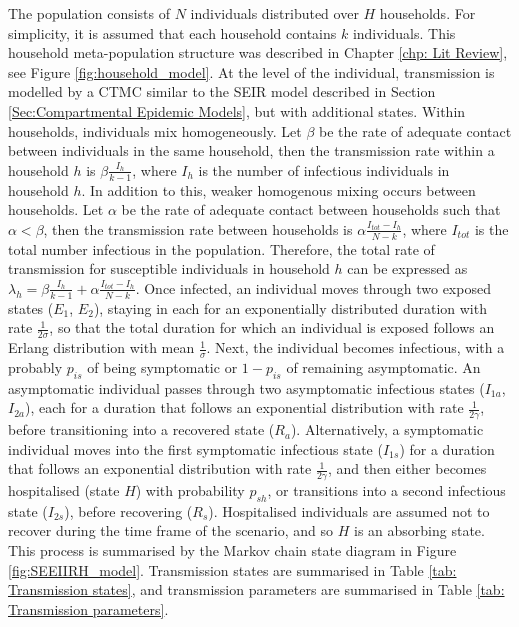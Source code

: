 The population consists of $N$ individuals distributed over $H$ households. For simplicity, it is assumed that each household contains $k$ individuals. This household meta-population structure was described in Chapter \ref{chp: Lit Review}, see Figure \ref{fig:household_model}. At the level of the individual, transmission is modelled by a CTMC similar to the SEIR model described in Section \ref{Sec:Compartmental Epidemic Models}, but with additional states. Within households, individuals mix homogeneously. Let $\beta$ be the rate of adequate contact between individuals in the same household, then the transmission rate within a household $h$ is $\beta \frac{I_h}{k-1}$, where $I_h$ is the number of infectious individuals in household $h$. In addition to this, weaker homogenous mixing occurs between households. Let $\alpha$ be the rate of adequate contact between households such that $\alpha < \beta$, then the transmission rate between households is $\alpha \frac{I_{tot}-I_h}{N-k}$, where $I_{tot}$ is the total number infectious in the population. Therefore, the total rate of transmission for susceptible individuals in household $h$ can be expressed as $\lambda_h = \beta \frac{I_h}{k-1} + \alpha \frac{I_{tot}-I_h}{N-k}$. Once infected, an individual moves through two exposed states ($E_1$, $E_2$), staying in each for an exponentially distributed duration with rate $\frac{1}{2\sigma}$, so that the total duration for which an individual is exposed follows an Erlang distribution with mean $\frac{1}{\sigma}$.
Next, the individual becomes infectious, with a probably $p_{is}$ of being symptomatic or $1-p_{is}$ of remaining asymptomatic. An asymptomatic individual passes through two asymptomatic infectious states ($I_{1a}$, $I_{2a}$), each for a duration that follows an exponential distribution with rate $\frac{1}{2\gamma}$, before transitioning into a recovered state ($R_a$). Alternatively, a symptomatic individual moves into the first symptomatic infectious state ($I_{1s}$) for a duration that follows an exponential distribution with rate $\frac{1}{2\gamma}$, and then either becomes hospitalised (state $H$) with probability $p_{sh}$, or transitions into a second infectious state ($I_{2s}$), before recovering ($R_s$). Hospitalised individuals are assumed not to recover during the time frame of the scenario, and so $H$ is an absorbing state. This process is summarised by the Markov chain state diagram in Figure \ref{fig:SEEIIRH_model}.
Transmission states are summarised in Table \ref{tab: Transmission states}, and transmission parameters are summarised in Table \ref{tab: Transmission parameters}.

